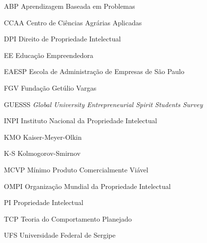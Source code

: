 
\begin{siglas}
\item[ABP]{ Aprendizagem Baseada em Problemas}
\item[CCAA]{Centro de Ciências Agrárias Aplicadas}
\item[DPI]{Direito de Propriedade Intelectual}
\item[EE]{Educação Empreendedora}
\item[EAESP]{Escola de Administração de Empresas de São Paulo}
\item[FGV]{Fundação Getúlio Vargas}
\item[GUESSS]{\textit{Global University Entrepreneurial Spirit Students Survey}}
\item[INPI]{Instituto Nacional da Propriedade Intelectual}
\item[KMO]{Kaiser-Meyer-Olkin}
\item[K-S]{Kolmogorov-Smirnov}
\item[MCVP]{Mínimo Produto Comercialmente Viável}
\item[OMPI]{Organização Mundial da Propriedade Intelectual}
\item[PI]{Propriedade Intelectual}
\item[TCP]{Teoria do Comportamento Planejado}
\item[UFS]{Universidade Federal de Sergipe}
\end{siglas}
